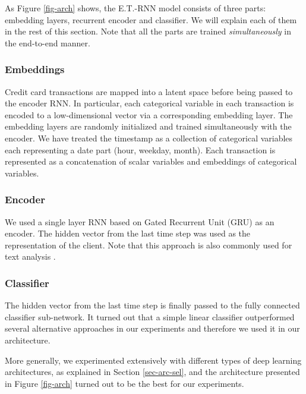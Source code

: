 \documentclass[sigconf]{acmart}
\begin{document}
As Figure \ref{fig-arch} shows, the E.T.-RNN model consists of three parts: embedding layers, recurrent encoder and classifier. We will explain each of them in the rest of this section. Note that all the parts are trained \textit{simultaneously} in the end-to-end manner.

\subsubsection{Embeddings}

Credit card transactions are mapped into a latent space before being passed to the encoder RNN. In particular, each categorical variable in each transaction is encoded to a low-dimensional vector via a corresponding embedding layer. The embedding layers are randomly initialized and trained simultaneously with the encoder. We have treated the timestamp as a collection of categorical variables each representing a date part (hour, weekday, month). Each transaction is represented as a concatenation of scalar variables and embeddings of categorical variables.

\subsubsection{Encoder}

We used a single layer RNN based on Gated Recurrent Unit (GRU) \cite{DBLP:journals/corr/ChoMGBSB14} as an encoder.  The hidden vector from the last time step was used as the representation of the client. Note that this approach is also commonly used for text analysis \cite{Sutskever:2014:SSL:2969033.2969173}.

\subsubsection{Classifier}

The hidden vector from the last time step is finally passed to the fully connected classifier sub-network.
It turned out that a simple linear classifier outperformed several alternative approaches in our experiments and therefore we used it in our architecture.

More generally, we experimented extensively with different types of deep learning architectures, as explained in Section \ref{sec-arc-sel}, and the architecture presented in Figure \ref{fig-arch} turned out to be the best for our experiments.
\end{document}
